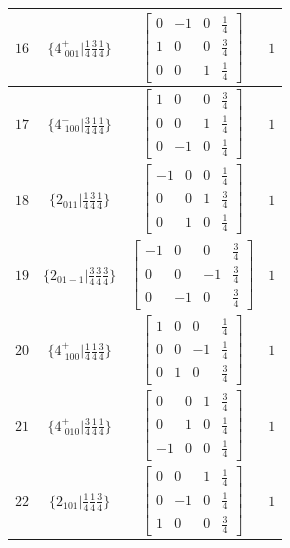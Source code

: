 \documentclass[fleqn,8pt]{jsarticle}
\begin{document}
\begin{longtable}{cccc}
$ 16 $ & $ \{4^{+}_{\,\,001}|\frac{1}{4} \frac{3}{4} \frac{1}{4}\} $ & $ \begin{bmatrix} 0 & -1 & 0 & \frac{1}{4} \\ 1 & 0 & 0 & \frac{3}{4} \\ 0 & 0 & 1 & \frac{1}{4} \end{bmatrix} $ & $ 1 $ \\ \hline
$ 17 $ & $ \{4^{-}_{\,\,100}|\frac{3}{4} \frac{1}{4} \frac{1}{4}\} $ & $ \begin{bmatrix} 1 & 0 & 0 & \frac{3}{4} \\ 0 & 0 & 1 & \frac{1}{4} \\ 0 & -1 & 0 & \frac{1}{4} \end{bmatrix} $ & $ 1 $ \\ \hline
$ 18 $ & $ \{2{}_{011}|\frac{1}{4} \frac{3}{4} \frac{1}{4}\} $ & $ \begin{bmatrix} -1 & 0 & 0 & \frac{1}{4} \\ 0 & 0 & 1 & \frac{3}{4} \\ 0 & 1 & 0 & \frac{1}{4} \end{bmatrix} $ & $ 1 $ \\ \hline
$ 19 $ & $ \{2{}_{01-1}|\frac{3}{4} \frac{3}{4} \frac{3}{4}\} $ & $ \begin{bmatrix} -1 & 0 & 0 & \frac{3}{4} \\ 0 & 0 & -1 & \frac{3}{4} \\ 0 & -1 & 0 & \frac{3}{4} \end{bmatrix} $ & $ 1 $ \\ \hline
$ 20 $ & $ \{4^{+}_{\,\,100}|\frac{1}{4} \frac{1}{4} \frac{3}{4}\} $ & $ \begin{bmatrix} 1 & 0 & 0 & \frac{1}{4} \\ 0 & 0 & -1 & \frac{1}{4} \\ 0 & 1 & 0 & \frac{3}{4} \end{bmatrix} $ & $ 1 $ \\ \hline
$ 21 $ & $ \{4^{+}_{\,\,010}|\frac{3}{4} \frac{1}{4} \frac{1}{4}\} $ & $ \begin{bmatrix} 0 & 0 & 1 & \frac{3}{4} \\ 0 & 1 & 0 & \frac{1}{4} \\ -1 & 0 & 0 & \frac{1}{4} \end{bmatrix} $ & $ 1 $ \\ \hline
$ 22 $ & $ \{2{}_{101}|\frac{1}{4} \frac{1}{4} \frac{3}{4}\} $ & $ \begin{bmatrix} 0 & 0 & 1 & \frac{1}{4} \\ 0 & -1 & 0 & \frac{1}{4} \\ 1 & 0 & 0 & \frac{3}{4} \end{bmatrix} $ & $ 1 $ \\ \hline

\end{longtable}
\end{document}
